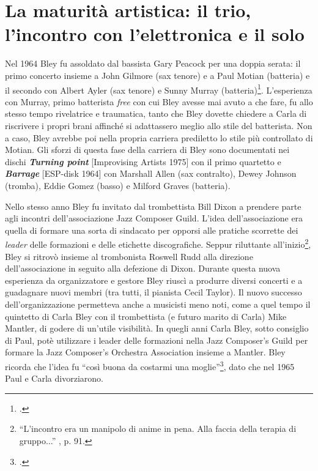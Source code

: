 \section{La maturità artistica: il trio, l'incontro con l'elettronica e il solo}
Nel 1964 Bley fu assoldato dal bassista Gary Peacock per una doppia serata: il primo concerto insieme a John Gilmore (sax tenore) e a Paul Motian (batteria) e il secondo con Albert Ayler (sax tenore) e Sunny Murray (batteria)\footcite[89]{stopping}. L'esperienza con Murray, primo batterista \textit{free} con cui Bley avesse mai avuto a che fare, fu allo stesso tempo rivelatrice e traumatica, tanto che Bley dovette chiedere a Carla di riscrivere i propri brani affinché si adattassero meglio allo stile del batterista. Non a caso, Bley avrebbe poi nella propria carriera prediletto lo stile più controllato di Motian. Gli sforzi di questa fase della carriera di Bley sono documentati nei dischi \textit{\textbf{Turning point}} [Improvising Artists 1975] con il primo quartetto e \textit{\textbf{Barrage}} [ESP-disk 1964] con Marshall Allen (sax contralto), Dewey Johnson (tromba), Eddie Gomez (basso) e Milford Graves (batteria).\par
Nello stesso anno Bley fu invitato dal trombettista Bill Dixon a prendere parte agli incontri dell'associazione Jazz Composer Guild. L'idea dell'associazione era quella di formare una sorta di sindacato per opporsi alle pratiche scorrette dei \textit{leader} delle formazioni e delle etichette discografiche. Seppur riluttante all'inizio\footnote{``L'incontro era un manipolo di anime in pena. Alla faccia della terapia di gruppo...'' \cite{stopping}, p. 91.}, Bley si ritrovò insieme al trombonista Roswell Rudd alla direzione dell'associazione in seguito alla defezione di Dixon. Durante questa nuova esperienza da organizzatore e gestore Bley riuscì a produrre diversi concerti e a guadagnare nuovi membri (tra tutti, il pianista Cecil Taylor). Il nuovo successo dell'organizzazione permetteva anche a musicisti meno noti, come a quel tempo il quintetto di Carla Bley con il trombettista (e futuro marito di Carla) Mike Mantler, di godere di un'utile visibilità. In quegli anni Carla Bley, sotto consiglio di Paul, potè utilizzare i leader delle formazioni nella Jazz Composer's Guild per formare la Jazz Composer's Orchestra Association insieme a Mantler. Bley ricorda che l'idea fu ``così buona da costarmi una moglie''\footcite[95]{stopping}, dato che nel 1965 Paul e Carla divorziarono.\par
